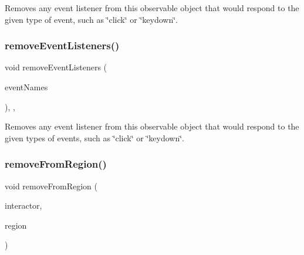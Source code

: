 Removes any event listener from this observable object that would respond to the given type of event, such as \char`\"{}click\char`\"{} or \char`\"{}keydown\char`\"{}. 

\mbox{\label{classGObservable_af51cc35c29a1bd1908609d432decdbb6}} 
\subsubsection{\texorpdfstring{remove\+Event\+Listeners()}{removeEventListeners()}}
{\footnotesize\ttfamily void remove\+Event\+Listeners (\begin{DoxyParamCaption}\item[{std\+::initializer\+\_\+list$<$ std\+::string $>$}]{event\+Names }\end{DoxyParamCaption})\hspace{0.3cm}{\ttfamily [protected]}, {\ttfamily [virtual]}, {\ttfamily [inherited]}}



Removes any event listener from this observable object that would respond to the given types of events, such as \char`\"{}click\char`\"{} or \char`\"{}keydown\char`\"{}. 

\mbox{\label{classGContainer_a87a74b040025878283ba685e30d5104f}} 
\subsubsection{\texorpdfstring{remove\+From\+Region()}{removeFromRegion()}\hspace{0.1cm}{\footnotesize\ttfamily [1/6]}}
{\footnotesize\ttfamily void remove\+From\+Region (\begin{DoxyParamCaption}\item[{\mbox{\hyperlink{classGInteractor}{G\+Interactor}} $\ast$}]{interactor,  }\item[{\mbox{\hyperlink{classGContainer_a81a01a86de31071a92e6cce0bab9bc4b}{Region}}}]{region }\end{DoxyParamCaption})\hspace{0.3cm}{\ttfamily [virtual]}}



